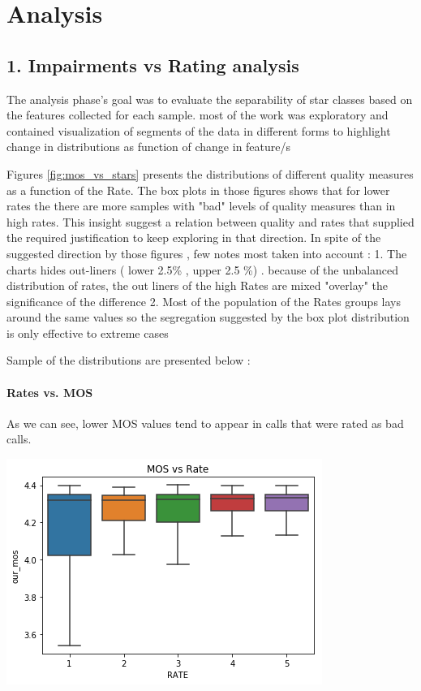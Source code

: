 


\section{Analysis}

\subsection{1. Impairments vs Rating analysis}

The analysis phase's goal was to evaluate the separability of star classes based on the features collected for each sample.
most of the work was exploratory and contained visualization of segments of the data in different forms to highlight change in distributions as function of change in feature/s

Figures  \ref{fig:mos_vs_stars} presents the distributions of different quality measures as a function of the Rate. The box plots in those figures shows that for lower rates the there are more samples with "bad" levels of quality measures than in high rates.
This insight suggest a relation between quality and rates that supplied the required justification to keep exploring in that direction.
In spite of the suggested direction by those figures , few notes most taken into account :
1. The charts hides out-liners ( lower 2.5\% , upper 2.5 \%) . because of the unbalanced distribution of rates, the out liners of the high Rates are mixed "overlay" the significance of the difference 
2. Most of the population of the Rates groups lays around the same values so the segregation suggested by the box plot distribution is only effective to extreme cases 

Sample of the distributions are presented below :

\paragraph{Rates vs. MOS}\label{rates-vs.-jitter}

As we can see, lower MOS values tend to appear in calls that were rated
as bad calls.

\begin{center}
\includegraphics{figures/output_23_0.png}
\end{center}

